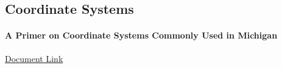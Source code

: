 
\subsection{Coordinate Systems}
\paragraph[Coordinate Systems for Michigan]{A Primer on Coordinate Systems Commonly Used in Michigan}
\href{../../documentation/readingRoom/geography101/MiCoordinateSystems.pdf}{Document Link}


